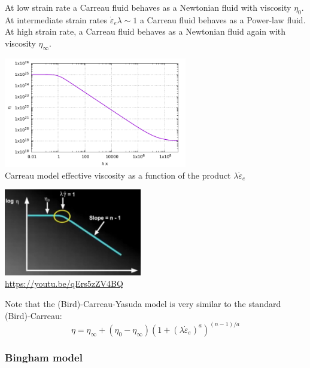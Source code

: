 At low strain rate a Carreau fluid behaves as a Newtonian fluid with viscosity $\eta_0$.
At intermediate strain rates $\dot{\varepsilon}_{e} \lambda \sim 1$ a Carreau fluid behaves 
as a Power-law fluid. At high strain rate, a Carreau fluid behaves as a Newtonian fluid 
again with viscosity $\eta_\infty$.
 
\begin{center}
\includegraphics[width=8cm]{images/rheology/carreau/carreau.pdf}\\
{\scriptsize Carreau model effective viscosity as a function of the product $\lambda \dot{\varepsilon}_{e}$}
\end{center}

\begin{center}
\includegraphics[width=6cm]{images/rheology/carreau/carreau1.png}\\
{\scriptsize \url{https://youtu.be/qErs5zZV4BQ}}
\end{center}

Note that the (Bird)-Carreau-Yasuda model \cite{osru14} is very similar to the standard (Bird)-Carreau:
\begin{equation}
\eta = \eta_\infty + (\eta_0-\eta_\infty) \left(1 + (\lambda \dot{\varepsilon}_{e})^a \right)^{(n-1)/a}
\end{equation}



\subsubsection{Bingham model}

